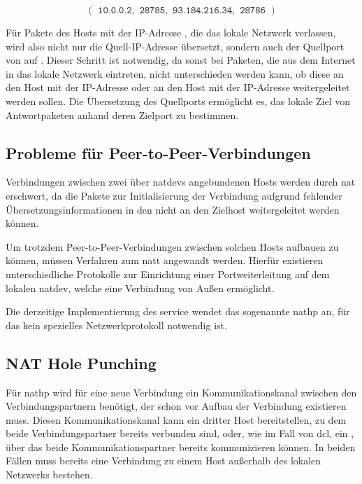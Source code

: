 \begin{equation*}
    (\texttt{ 10.0.0.2}, \texttt{ 28785}, \texttt{ 93.184.216.34}, \texttt{ 28786 })
\end{equation*}

Für Pakete des Hosts mit der IP-Adresse , die das lokale Netzwerk
verlassen, wird also nicht nur die Quell-IP-Adresse übersetzt, sondern auch der
Quellport von  auf . Dieser Schritt ist notwendig, da
sonst bei Paketen, die aus dem Internet in das lokale Netzwerk eintreten, nicht
unterschieden werden kann, ob diese an den Host mit der IP-Adresse
 oder an den Host mit der IP-Adresse 
weitergeleitet werden sollen. Die Übersetzung des Quellports ermöglicht es,
das lokale Ziel von Antwortpaketen anhand deren Zielport zu bestimmen.


\subsection{Probleme für Peer-to-Peer-Verbindungen}
Verbindungen zwischen zwei über \glspl{natdev} angebundenen Hosts werden durch
\acrlong{nat} erschwert, da die Pakete zur Initialisierung der Verbindung
aufgrund fehlender Übersetzungsinformationen in den
 nicht an den Zielhost weitergeleitet werden
können.

Um trotzdem Peer-to-Peer-Verbindungen zwischen solchen Hosts aufbauen zu können,
müssen Verfahren zum \gls{natt} angewandt werden.
Hierfür existieren unterschiedliche Protokolle zur Einrichtung einer
Portweiterleitung auf dem lokalen \gls{natdev}, welche eine Verbindung von Außen
ermöglicht.

Die derzeitige Implementierung des \gls{service} wendet das sogenannte
\gls{nathp} an, für das kein spezielles Netzwerkprotokoll notwendig ist.

\subsection{NAT Hole Punching}
Für \gls{nathp} wird für eine neue Verbindung ein Kommunikationskanal zwischen
den Verbindungspartnern benötigt, der schon vor Aufbau der Verbindung existieren
muss.
Diesen Kommunikationskanal kann ein dritter Host bereitstellen, zu dem beide
Verbindungspartner bereits verbunden sind, oder, wie im Fall von \gls{dcl},
ein , über das beide Kommunikationspartner bereits
kommunizieren können.
In beiden Fällen muss bereits eine Verbindung zu einem Host außerhalb des
lokalen Netzwerks bestehen.

